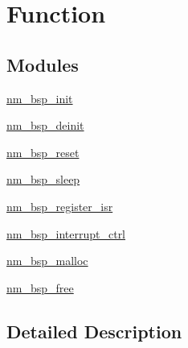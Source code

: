 \hypertarget{group__BSPAPI}{}\section{Function}
\label{group__BSPAPI}
\subsection*{Modules}
\begin{DoxyCompactItemize}
\item 
\hyperlink{group__NmBspInitFn}{nm\+\_\+bsp\+\_\+init}
\item 
\hyperlink{group__NmBspDeinitFn}{nm\+\_\+bsp\+\_\+deinit}
\item 
\hyperlink{group__NmBspResetFn}{nm\+\_\+bsp\+\_\+reset}
\item 
\hyperlink{group__NmBspSleepFn}{nm\+\_\+bsp\+\_\+sleep}
\item 
\hyperlink{group__NmBspRegisterFn}{nm\+\_\+bsp\+\_\+register\+\_\+isr}
\item 
\hyperlink{group__NmBspInterruptCtrl}{nm\+\_\+bsp\+\_\+interrupt\+\_\+ctrl}
\item 
\hyperlink{group__NmBspMalloc}{nm\+\_\+bsp\+\_\+malloc}
\item 
\hyperlink{group__NmBspFree}{nm\+\_\+bsp\+\_\+free}
\end{DoxyCompactItemize}


\subsection{Detailed Description}

